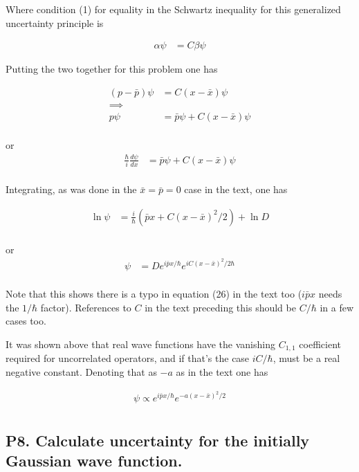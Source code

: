 \documentclass{article}
\begin{document}
Where condition (1) for equality in the Schwartz inequality for this 
generalized uncertainty principle is

\begin{align*}
\alpha \psi &= C \beta \psi
\end{align*}

Putting the two together for this problem one has

\begin{align*}
(p - \bar{p}) \psi &= C (x - \bar{x}) \psi \\
\implies \\
p \psi &= \bar{p} \psi + C (x - \bar{x}) \psi \\
\end{align*}

or
\begin{align*}
\frac{\hbar}{i} \frac{d\psi}{dx} &= \bar{p} \psi + C (x - \bar{x}) \psi \\
\end{align*}

Integrating, as was done in the $\bar{x} = \bar{p} = 0$ case in the text, 
one has

\begin{align*}
\ln \psi &= \frac{i}{\hbar}( \bar{p} x + C (x - \bar{x})^2/2 ) + \ln D \\
\end{align*}

or
\begin{align*}
\psi &= D e^{i\bar{p} x/\hbar} e^{ i C (x - \bar{x})^2/2\hbar } \\
\end{align*}

Note that this shows there is a typo in equation (26) in the text too ($i\bar{p} x$ needs the $1/\hbar$ factor).  References to $C$ in the text preceding this should be $C/\hbar$ in a few cases too.

It was shown above that real wave functions have the vanishing $C_{1,1}$ coefficient required for uncorrelated operators, and if that's the case $i C/\hbar$, must be a real negative constant.  Denoting that as $-a$ as in the text one has

\begin{align*}
\psi \propto e^{i\bar{p} x/\hbar} e^{ -a(x - \bar{x})^2/2} \\
\end{align*}

\subsection{P8. Calculate uncertainty for the initially Gaussian wave function. }
\end{document}
